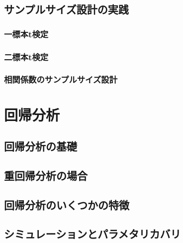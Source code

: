 \documentclass[
  a4paper,
]{ltjsbook}
\begin{document}
\section{サンプルサイズ設計の実践}\label{ux30b5ux30f3ux30d7ux30ebux30b5ux30a4ux30baux8a2dux8a08ux306eux5b9fux8df5}

\subsection{一標本t検定}\label{ux4e00ux6a19ux672ctux691cux5b9a}

\subsection{二標本t検定}\label{ux4e8cux6a19ux672ctux691cux5b9a}

\subsection{相関係数のサンプルサイズ設計}\label{ux76f8ux95a2ux4fc2ux6570ux306eux30b5ux30f3ux30d7ux30ebux30b5ux30a4ux30baux8a2dux8a08}


\chapter{回帰分析}\label{ux56deux5e30ux5206ux6790}

\section{回帰分析の基礎}\label{ux56deux5e30ux5206ux6790ux306eux57faux790e}

\section{重回帰分析の場合}\label{ux91cdux56deux5e30ux5206ux6790ux306eux5834ux5408}

\section{回帰分析のいくつかの特徴}\label{ux56deux5e30ux5206ux6790ux306eux3044ux304fux3064ux304bux306eux7279ux5fb4}

\section{シミュレーションとパラメタリカバリ}\label{ux30b7ux30dfux30e5ux30ecux30fcux30b7ux30e7ux30f3ux3068ux30d1ux30e9ux30e1ux30bfux30eaux30abux30d0ux30ea}
\end{document}
